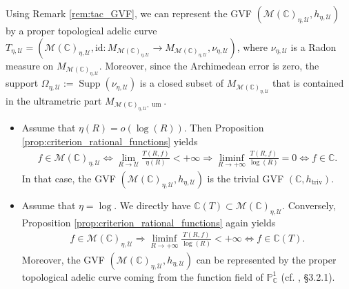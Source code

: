 \documentclass [11pt,reqno]{amsart}
\def\bC{{\mathbb{C}}}
\newcommand{\1}{\mathmybb{1}}
\def\cM{{\mathcal{M}}}
\def\cU{{\mathcal{U}}}
\def\Supp{\operatorname{Supp}}
\def\triv{\operatorname{triv}}
\def\um{\operatorname{um}}
\begin{document}
\begin{definition}
\label{def:tac_Nevanlinna_complex_eta,ultrafilter}
Using Remark \ref{rem:tac_GVF}, we can represent the GVF $(\cM(\bC)_{\eta,\cU},h_{\eta,\cU})$ by a proper topological adelic curve $T_{\eta,\cU}=(\cM(\bC)_{\eta,\cU}, \mathrm{id} : M_{\cM(\bC)_{\eta,\cU}} \to M_{\cM(\bC)_{\eta,\cU}},\nu_{\eta,\cU})$, where $\nu_{\eta,\cU}$ is a Radon measure on $M_{\cM(\bC)_{\eta,\cU}}$. Moreover, since the Archimedean error is zero, the support $\Omega_{\eta,\cU} := \Supp(\nu_{\eta,\cU})$ is a closed subset of $M_{\cM(\bC)_{\eta,\cU}}$ that is contained in the ultrametric part $M_{\cM(\bC)_{\eta,\cU},\um}$. 
\end{definition}

\begin{example}
\label{example:tac_Nevanlinna_complex_eta_ultrafilter}
\begin{itemize}
\item[(1)] Assume that $\eta(R) =  o(\log(R))$. Then Proposition \ref{prop:criterion_rational_functions} yields
\begin{align*}
f\in \cM(\bC)_{\eta,\cU} \Leftrightarrow \displaystyle\lim_{R\to\cU} \frac{T(R,f)}{\eta(R)} <+\infty \Rightarrow \liminf_{R\to+\infty} \frac{T(R,f)}{\log(R)} = 0 \Leftrightarrow f\in \bC.
\end{align*}
In that case, the GVF $(\cM(\bC)_{\eta,\cU},h_{\eta,\cU})$ is the trivial GVF $(\bC,h_{\triv})$. 
	\item[(2)] Assume that $\eta=\log$. We directly have $\bC(T)\subset \cM(\bC)_{\eta,\cU}$. Conversely, Proposition \ref{prop:criterion_rational_functions} again yields
	\begin{align*}
	f\in \cM(\bC)_{\eta,\cU} \Rightarrow \liminf_{R\to+\infty} \frac{T(R,f)}{\log(R)} <+\infty \Leftrightarrow f\in \bC(T).
	\end{align*}
	Moreover, the GVF $(\cM(\bC)_{\eta,\cU},h_{\eta,\cU})$ can be represented by the proper topological adelic curve coming from the function field of $\mathbb{P}_{\bC}^{1}$ (cf. \cite{ChenMori}, \S 3.2.1).
\end{itemize} 
\end{example}
\end{document}
